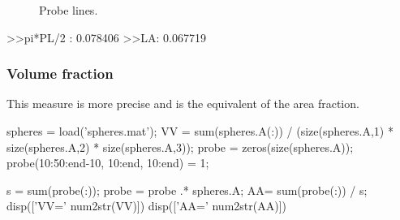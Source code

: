 \begin{figure}[htbp]
 \centering
 \hfill
 \hfill
 
 \caption{Probe lines.}
 \label{fig:stereology:matlab:probeline}
\end{figure}

\begin{mwindow}
>>pi*PL/2 : 0.078406
>>LA: 0.067719
\end{mwindow}


\subsubsection{Volume fraction}
This measure is more precise and is the equivalent of the area fraction.
\begin{matlab}
spheres = load('spheres.mat');
VV = sum(spheres.A(:)) / (size(spheres.A,1) * size(spheres.A,2) * size(spheres.A,3));
probe = zeros(size(spheres.A));
probe(10:50:end-10, 10:end, 10:end) = 1;

s = sum(probe(:));
probe = probe .* spheres.A;
AA= sum(probe(:)) / s;
disp(['VV=' num2str(VV)])
disp(['AA=' num2str(AA)])
\end{matlab}

